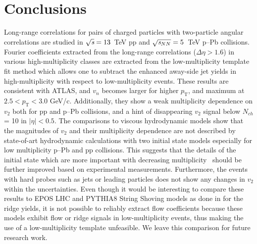 
\section{Conclusions}
\label{sec:summary}
Long-range correlations for pairs of charged particles with two-particle angular correlations are studied in ${\sqrt{{\textit s}}}=13$~TeV pp and ${\sqrt{{\textit s_{NN}}}}=5$~TeV p--Pb collisions. Fourier coefficients extracted from the long-range correlations ($\Delta\eta > 1.6$) in various high-multiplicity classes are extracted from the low-multiplicity template fit method which allows one to subtract the enhanced away-side jet yields in high-multiplicity with respect to low-multiplicity events.
These results are consistent with ATLAS, and $v_n$ becomes larger for higher $p_\mathrm{T}$, and maximum at $2.5<p_\mathrm{T}<3.0$ GeV/c. 
Additionally, they show a weak multiplicity dependence on $v_2$ both for pp and p--Pb collisions, and a hint of disappearing $v_2$ signal below $N_{ch}$ = 10 in $|\eta|<0.5$. 
The comparisons to viscous hydrodynamic models show that the magnitudes of $v_2$ and their multiplicity dependence are not described by state-of-art hydrodynamic calculations with two initial state models especially for low multiplicity p--Pb and pp collisions. This suggests that the details of the initial state which are more important with decreasing multiplicity~\cite{Greif:2017bnr,Moreland:2018gsh} should be further improved based on experimental measurements. 
Furthermore, the events with hard probes such as jets or leading particles does not show any changes in $v_2$ within the uncertainties. 
Even though it would be interesting to compare these results to EPOS LHC and PYTHIA8 String Shoving models as done in \cite{ALICE:2012eyl} for the ridge yields, it is not possible to reliably extract flow coefficients because these models exhibit flow or ridge signals in low-multiplicity events, thus making the use of a low-multiplicity template unfeasible. We leave this comparison for future research work.

